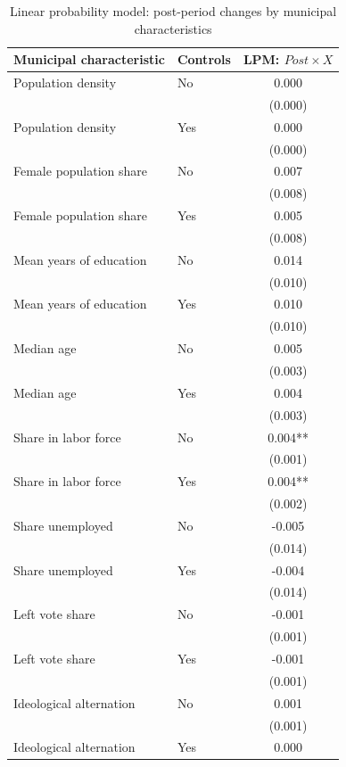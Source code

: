 \begin{table}[!htbp]
\centering
\renewcommand{\arraystretch}{1.25}
\setlength{\tabcolsep}{6pt}
\caption{Linear probability model: post-period changes by municipal characteristics}
\label{tab:lpm_post_x_mfx_stata}
\small
\begin{tabular}{llc}
\hline
Municipal characteristic & Controls & LPM: \(Post \times X\) \\
\hline
Population density & No & 0.000 \\
 & & (0.000) \\
Population density & Yes & 0.000 \\
 & & (0.000) \\
\addlinespace
Female population share & No & 0.007 \\
 & & (0.008) \\
Female population share & Yes & 0.005 \\
 & & (0.008) \\
\addlinespace
Mean years of education & No & 0.014 \\
 & & (0.010) \\
Mean years of education & Yes & 0.010 \\
 & & (0.010) \\
\addlinespace
Median age & No & 0.005 \\
 & & (0.003) \\
Median age & Yes & 0.004 \\
 & & (0.003) \\
\addlinespace
Share in labor force & No & 0.004** \\
 & & (0.001) \\
Share in labor force & Yes & 0.004** \\
 & & (0.002) \\
\addlinespace
Share unemployed & No & -0.005 \\
 & & (0.014) \\
Share unemployed & Yes & -0.004 \\
 & & (0.014) \\
\addlinespace
Left vote share & No & -0.001 \\
 & & (0.001) \\
Left vote share & Yes & -0.001 \\
 & & (0.001) \\
\addlinespace
Ideological alternation & No & 0.001 \\
 & & (0.001) \\
Ideological alternation & Yes & 0.000 \\

\end{tabular}
\end{table}
